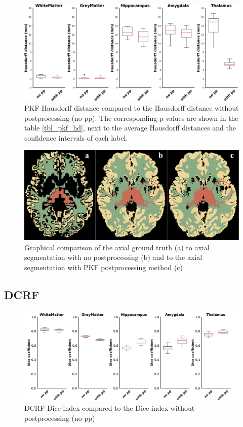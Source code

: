 \documentclass[journal]{IEEEtran}
\begin{document}
\begin{figure}[h!]
\centering

\includegraphics[width=4.9in]{img/boxplots/PKF-HD.png}
\caption{PKF Hausdorff distance compared to the Hausdorff distance without postprocessing (no pp). The corresponding p-values are shown in the table \ref{tbl_pkf_hd}, next to the average Hausdorff distances and the confidence intervals of each label.}
\label{fig_pkf-hd_appendix}
\end{figure}

\begin{figure}[h!]
\centering

\includegraphics[width=4.9in]{img/boxplots/PKF.png}
\caption{Graphical comparison of the axial ground truth (a) to axial segmentation with no postprocessing (b) and to the axial segmentation with PKF postprocessing method (c) }
\label{fig_pkf_appendix}
\end{figure}
\newpage
\subsection{DCRF}
\label{sec_bb_dcrf}
\begin{figure}[h!]
\centering
\includegraphics[width=4.9in]{img/boxplots/DCRF-DICE.png}
\caption{DCRF Dice index compared to the Dice index without postprocessing (no pp)}
\label{fig_dcrf_dice_appendix}
\end{figure}
\end{document}
